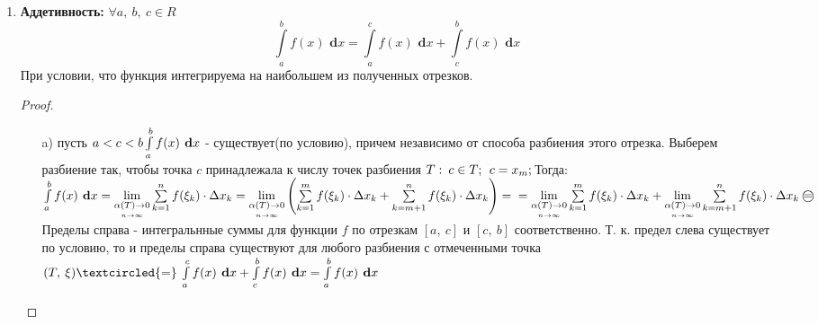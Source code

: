 \documentclass[a4paper,12pt]{bookest}
\theoremstyle{remark}
\newcommand\dx{\textbf{ d}x}
\begin{document}
\begin{enumerate}
		$$
		f(x)\in R([a,\>b]);\>g(x)\in R([a,\>b]), \textrm{ то:} $$$$\int\limits_{a}^{b}(\alpha f(x)+\beta g(x) )\dx = \alpha\int\limits_{a}^{b}f(x)\dx+\beta \int\limits_{a}^{b}g(x)\dx
		$$\begin{proof}
			$\forall(T,\>\xi):\>\sum\limits_{k=1}^{n}(\alpha f(\xi_k)+\beta g(\xi_k))\cdot\Delta x_k=\alpha\sum\limits_{k=1}^{n} f(\xi_k)\Delta x_k+\beta\sum\limits_{k=1}^{n}g(\xi_k)\Delta x_k,\\\int\limits_{a}^{b}(\alpha f(x)+\beta g(x) )\dx=\lim\limits_{\underset{n\to\infty}{\alpha(T)\to0}}\sum\limits_{k=1}^{n}(\alpha f(\xi_k)+\beta g(\xi_k))\cdot\Delta x_k=\alpha\lim\limits_{\underset{n\to\infty}{\alpha(T)\to0}}\sum\limits_{k=1}^{n} f(\xi_k)\Delta x_k+\\+\beta\lim\limits_{\underset{n\to\infty}{\alpha(T)\to0}}\sum\limits_{k=1}^{n}g(\xi_k)\Delta x_k=\alpha\int\limits_{a}^{b}f(x)\dx+\beta\int\limits_{a}^{b}g(x)\dx$
		\end{proof}
	\item \textbf{Аддетивность:} $\forall a,\>b,\>c\in R$ $$\int\limits_{a}^{b}f(x)\dx=\int\limits_{a}^{c}f(x)\dx+\int\limits_{c}^{b}f(x)\dx$$ При условии, что функция интегрируема на наибольшем из полученных отрезков. \begin{proof}$ $
			\begin{itemize}
				\item [a)] пусть $a<c<b\\\int\limits_{a}^{b}f(x)\dx$ - существует(по условию), причем независимо от способа разбиения этого отрезка. Выберем разбиение так, чтобы 	точка $c$ принадлежала к числу точек разбиения $T:\>c\in T;\>\>c=x_m;\\$Тогда:\\$\int\limits_{a}^{b}f(x)\dx=\lim\limits_{\underset{n\to\infty}{\alpha(T)\to0}}\sum\limits_{k=1}^{n} f(\xi_k)\cdot\Delta x_k =\lim\limits_{\underset{n\to\infty}{\alpha(T)\to0}}\left(\sum\limits_{k=1}^{m} f(\xi_k)\cdot\Delta x_k+\sum\limits_{k=m+1}^{n} f(\xi_k)\cdot\Delta x_k \right)=\\=\lim\limits_{\underset{n\to\infty}{\alpha(T)\to0}}\sum\limits_{k=1}^{m} f(\xi_k)\cdot\Delta x_k+\lim\limits_{\underset{n\to\infty}{\alpha(T)\to0}}\sum\limits_{k=m+1}^{n} f(\xi_k)\cdot\Delta x_k\>\textrm{\textcircled{=}}\\$ Пределы справа - интегральнные суммы для функции $f$ по отрезкам $[a,\>c]$ и $[c,\>b]$ соответственно. Т. к. предел слева существует по условию, то и пределы справа существуют для любого разбиения с отмеченными точка $(T,\>\xi)\\\textcircled{=}\>\int\limits_{a}^{c}f(x)\dx+\int\limits_{c}^{b}f(x)\dx=\int\limits_{a}^{b}f(x)\dx$ 

\end{itemize}
\end{proof}
\end{enumerate}
\end{document}
